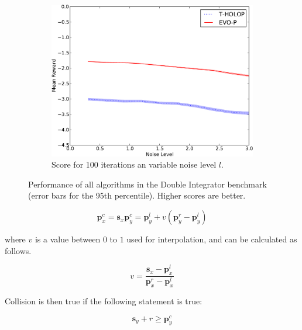 \documentclass[conference]{IEEEtran}
\begin{document}
\begin{figure}[ht]
\begin{subfigure}[b]{0.32\textwidth}
                \label{fig:DI-N-50}
        \end{subfigure}   \begin{subfigure}[b]{0.32\textwidth}
                \centering
                \includegraphics[width=1.0\textwidth]{graphics/online-noise-DI_100-crop.pdf}
                \caption{Score for 100 iterations an variable noise level $l$.}
                \label{fig:DI-N-100}
        \end{subfigure}

  \label{fig:DI-all}

       \caption{Performance of all algorithms in the Double Integrator benchmark (error bars for the 95th percentile). Higher scores are better.}


\end{figure}

\begin{equation}
\bm {p}_{x}^{c} = \bm {s}_{x}
\bm {p}_{y}^{c} = \bm {p}_{y}^{l} + v(\bm {p}_{y}^{r} - \bm {p}_{y}^{l})
\end{equation}

where $v$ is a value between $0$ to $1$ used for interpolation, and can be calculated as follows.

\begin{equation}
v = \frac{ {\bm {s}_{x} - \bm {p}_{x}^{l}}}{ {\bm {p}_{x}^{r} - \bm {p}_{x}^{l}} }
\end{equation}

Collision is then true if the following statement is true:

\begin{equation}
\bm {s}_{y} + r \geq \bm {p}^{c}_{y}
\end{equation}
\end{document}

